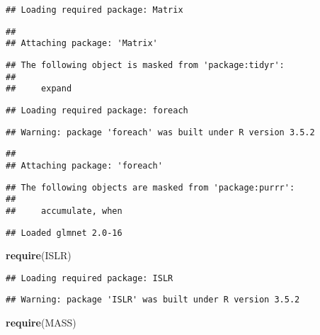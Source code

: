 \documentclass[]{article}
\newenvironment{Shaded}{\begin{snugshade}}{\end{snugshade}}
\newcommand{\KeywordTok}[1]{\textcolor[rgb]{0.13,0.29,0.53}{\textbf{#1}}}
\newcommand{\NormalTok}[1]{#1}
\begin{document}
\begin{verbatim}
## Loading required package: Matrix
\end{verbatim}

\begin{verbatim}
## 
## Attaching package: 'Matrix'
\end{verbatim}

\begin{verbatim}
## The following object is masked from 'package:tidyr':
## 
##     expand
\end{verbatim}

\begin{verbatim}
## Loading required package: foreach
\end{verbatim}

\begin{verbatim}
## Warning: package 'foreach' was built under R version 3.5.2
\end{verbatim}

\begin{verbatim}
## 
## Attaching package: 'foreach'
\end{verbatim}

\begin{verbatim}
## The following objects are masked from 'package:purrr':
## 
##     accumulate, when
\end{verbatim}

\begin{verbatim}
## Loaded glmnet 2.0-16
\end{verbatim}

\begin{Shaded}
\begin{Highlighting}[]
\KeywordTok{require}\NormalTok{(ISLR)}
\end{Highlighting}
\end{Shaded}

\begin{verbatim}
## Loading required package: ISLR
\end{verbatim}

\begin{verbatim}
## Warning: package 'ISLR' was built under R version 3.5.2
\end{verbatim}

\begin{Shaded}
\begin{Highlighting}[]
\KeywordTok{require}\NormalTok{(MASS)}
\end{Highlighting}
\end{Shaded}
\end{document}
